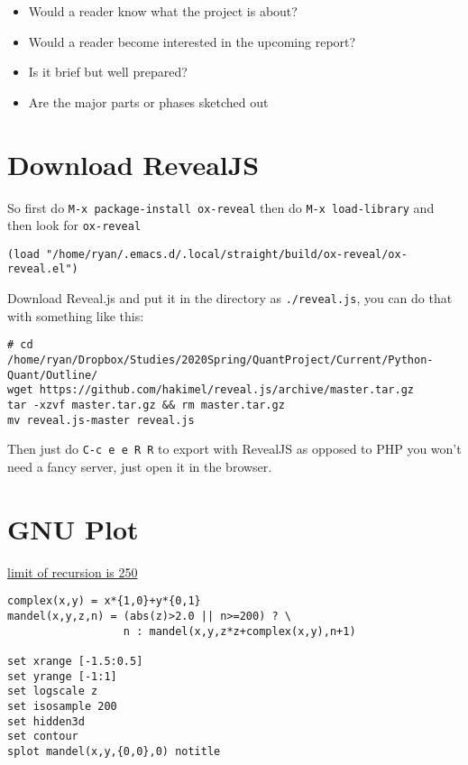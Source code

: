 \documentclass[11pt]{article}
\begin{document}
\begin{itemize}
\item Would a reader know what the project is about?
\item Would a reader become interested in the upcoming report?
\item Is it brief but well prepared?
\item Are the major parts or phases sketched out
\end{itemize}



\section{Download RevealJS}
\label{sec:org518cfab}
So first do \texttt{M-x package-install ox-reveal} then do \texttt{M-x load-library} and then look for \texttt{ox-reveal}

\begin{verbatim}
(load "/home/ryan/.emacs.d/.local/straight/build/ox-reveal/ox-reveal.el")
\end{verbatim}

Download Reveal.js and put it in the directory as \texttt{./reveal.js}, you can do that with something like this:

\begin{verbatim}
# cd /home/ryan/Dropbox/Studies/2020Spring/QuantProject/Current/Python-Quant/Outline/
wget https://github.com/hakimel/reveal.js/archive/master.tar.gz
tar -xzvf master.tar.gz && rm master.tar.gz
mv reveal.js-master reveal.js
\end{verbatim}

Then just do \texttt{C-c e e R R} to export with RevealJS as opposed to PHP you won't need a fancy server, just open it in the browser.
\section{GNU Plot}
\label{sec:orged5cfe1}
\href{https://rosettacode.org/wiki/Find\_limit\_of\_recursion\#gnuplot}{limit of recursion is 250}

\begin{verbatim}
complex(x,y) = x*{1,0}+y*{0,1}
mandel(x,y,z,n) = (abs(z)>2.0 || n>=200) ? \
                  n : mandel(x,y,z*z+complex(x,y),n+1)

set xrange [-1.5:0.5]
set yrange [-1:1]
set logscale z
set isosample 200
set hidden3d
set contour
splot mandel(x,y,{0,0},0) notitle
\end{verbatim}
\end{document}
